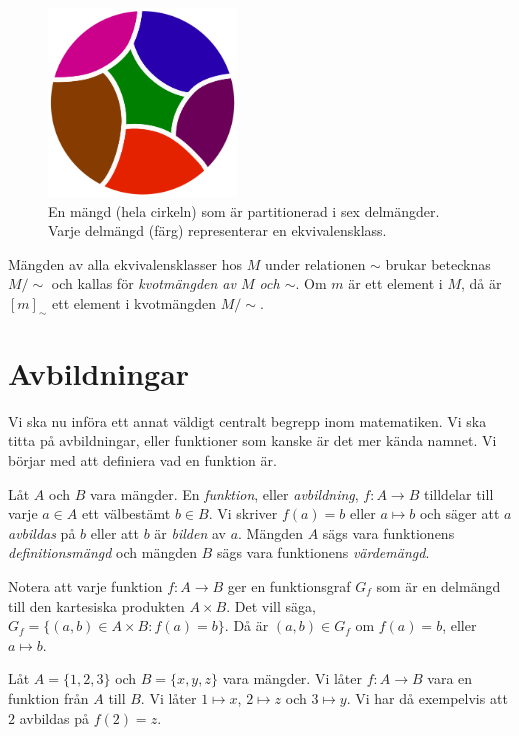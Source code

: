 \begin{figure}
  \includegraphics[width=5cm]{figs/set_partition.pdf}
  \caption{%
    En mängd (hela cirkeln) som är partitionerad i sex delmängder.
    Varje delmängd (färg) representerar en ekvivalensklass.
  }\label{fig:setPartition}
\end{figure}

Mängden av alla ekvivalensklasser hos \(M\) under relationen \(\sim\)
brukar betecknas \(M/\!\sim\) och kallas för \emph{kvotmängden av \(M\)
och \(\sim\)}.
Om \(m\) är ett element i \(M\), då är \([m]_\sim\) ett element i kvotmängden
\(M/\!\sim\).


\section{Avbildningar}
Vi ska nu införa ett annat väldigt centralt begrepp inom matematiken.
Vi ska titta på avbildningar, eller funktioner som kanske är det mer kända 
namnet.
Vi börjar med att definiera vad en funktion är.

\begin{definition}\label{def:Avbildning}
  Låt \(A\) och \(B\) vara mängder.
  En \emph{funktion}, eller \emph{avbildning}, \(f\colon A\to B\) tilldelar
  till varje \(a\in A\) ett välbestämt \(b\in B\).
  Vi skriver \(f(a)=b\) eller \(a\mapsto b\) och säger att \(a\)
  \emph{avbildas} på \(b\) eller att \(b\) är \emph{bilden} av \(a\).
  Mängden \(A\) sägs vara funktionens \emph{definitionsmängd} och mängden
  \(B\) sägs vara funktionens \emph{värdemängd}.
\end{definition}
\begin{remark}
  Notera att varje funktion \(f\colon A\to B\) ger en funktionsgraf \(G_f\)
  som är en delmängd till den kartesiska produkten \(A\times B\).
  Det vill säga, \(G_f = \{(a,b)\in A\times B\colon f(a)=b\}\).
  Då är \((a,b)\in G_f\) om \(f(a)=b\), eller \(a\mapsto b\).
\end{remark}
\begin{example}
  Låt \(A=\{1,2,3\}\) och \(B=\{x,y,z\}\) vara mängder.
  Vi låter \(f\colon A\to B\) vara en funktion från \(A\) till \(B\).
  Vi låter \(1\mapsto x\), \(2\mapsto z\) och \(3\mapsto y\).
  Vi har då exempelvis att \(2\) avbildas på \(f(2)=z\).
\end{example}

